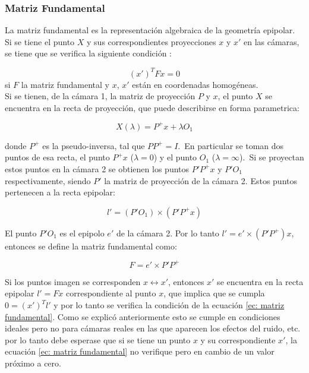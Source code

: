 \subsubsection{Matriz Fundamental}

La matriz fundamental es la representación algebraica de la geometría epipolar. Si se tiene el punto $X$ y sus correspondientes proyecciones $x$ y $x'$ en las cámaras, se tiene que se verifica la siguiente condición :

\begin{equation}
(x')^T F x = 0
\label{ec: matriz fundamental}
\end{equation}
si  $F$ la matriz fundamental y $x$, $x'$ están en coordenadas homogéneas.\\

Si se tienen, de la cámara 1, la matriz de proyección $P$ y $x$, el punto $X$ se encuentra en la recta de proyección, que puede describirse en forma parametrica:

\begin{equation}
	X(\lambda) = P^+x+\lambda O_1
\end{equation}

donde $P^+$ es la pseudo-inversa, tal que $PP^+=I$.\
En particular se toman dos puntos de esa recta, el punto $P^+x$ ($\lambda = 0$) y el punto $O_1$ ($\lambda = \infty$).\
Si se proyectan estos puntos en la cámara 2 se obtienen los puntos $P'P^+x$ y $P'O_1$ respectivamente, siendo $P'$ la matriz de proyección de la cámara 2. Estos puntos pertenecen a la recta epipolar:

\begin{equation}
l' = (P'O_1) \times (P'P^+ x)
\end{equation}

El punto $P'O_1$ es el epipolo $e'$ de la cámara 2. Por lo tanto $l' = e' \times (P'P^+) x$, entonces se define la matriz fundamental como:

\begin{equation}
F=e' \times P'P^+
\end{equation}

Si los puntos imagen se corresponden $x \leftrightarrow x'$, entonces $x'$ se encuentra en la recta epipolar $l'=Fx$ correspondiente al punto $x$, que implica que se cumpla $0=(x')^Tl'$ y por lo tanto se verifica la condición de la ecuación \ref{ec: matriz fundamental}. Como se explicó anteriormente esto se cumple en condiciones ideales pero no para cámaras reales en las que aparecen los efectos del ruido, etc. por lo tanto debe esperase que si se tiene un punto $x$ y su correspondiente $x'$, la ecuación \ref{ec: matriz fundamental} no verifique pero en cambio de un valor próximo a cero.\\

